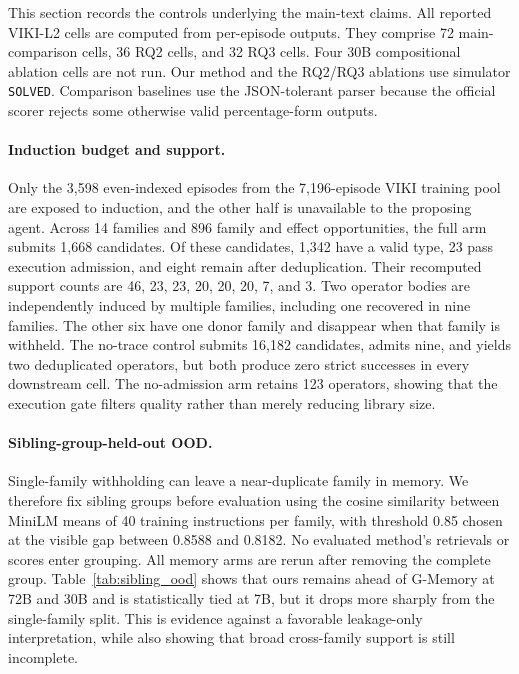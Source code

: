 \documentclass{article}
\theoremstyle{plain}
\theoremstyle{definition}
\theoremstyle{remark}
\begin{document}
This section records the controls underlying the main-text claims. All reported VIKI-L2 cells are computed from per-episode outputs. They comprise 72 main-comparison cells, 36 RQ2 cells, and 32 RQ3 cells. Four 30B compositional ablation cells are not run. Our method and the RQ2/RQ3 ablations use simulator \texttt{SOLVED}. Comparison baselines use the JSON-tolerant parser because the official scorer rejects some otherwise valid percentage-form outputs.

\paragraph{Induction budget and support.}
Only the 3{,}598 even-indexed episodes from the 7{,}196-episode VIKI training pool are exposed to induction, and the other half is unavailable to the proposing agent. Across 14 families and 896 family and effect opportunities, the full arm submits 1{,}668 candidates. Of these candidates, 1{,}342 have a valid type, 23 pass execution admission, and eight remain after deduplication. Their recomputed support counts are 46, 23, 23, 20, 20, 20, 7, and 3. Two operator bodies are independently induced by multiple families, including one recovered in nine families. The other six have one donor family and disappear when that family is withheld. The no-trace control submits 16{,}182 candidates, admits nine, and yields two deduplicated operators, but both produce zero strict successes in every downstream cell. The no-admission arm retains 123 operators, showing that the execution gate filters quality rather than merely reducing library size.

\paragraph{Sibling-group-held-out OOD.}
Single-family withholding can leave a near-duplicate family in memory. We therefore fix sibling groups before evaluation using the cosine similarity between MiniLM means of 40 training instructions per family, with threshold 0.85 chosen at the visible gap between 0.8588 and 0.8182. No evaluated method's retrievals or scores enter grouping. All memory arms are rerun after removing the complete group. Table~\ref{tab:sibling_ood} shows that ours remains ahead of G-Memory at 72B and 30B and is statistically tied at 7B, but it drops more sharply from the single-family split. This is evidence against a favorable leakage-only interpretation, while also showing that broad cross-family support is still incomplete.
\end{document}
